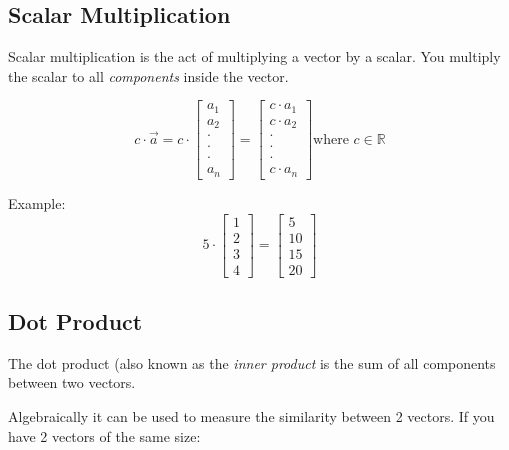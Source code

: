 \documentclass[12pt]{report}
\begin{document}
        \newpage
        \subsection{Scalar Multiplication}
            Scalar multiplication is the act of multiplying a vector by a scalar. You multiply the scalar to all \emph{components} inside the vector.

            \begin{equation}
                c \cdot \vec{a} = c \cdot
                    \begin{bmatrix} a_1 \\ a_2 \\ \cdot \\ \cdot \\ \cdot \\ a_n \end{bmatrix} =
                    \begin{bmatrix}  c \cdot a_1 \\ c \cdot a_2 \\ \cdot \\ \cdot \\ \cdot \\  c \cdot a_n \end{bmatrix} 
                \text{where } c \in \mathbb{R}
            \end{equation}

            Example:
            \begin{equation}
                5 \cdot \begin{bmatrix} 1 \\ 2 \\ 3 \\ 4 \end{bmatrix} =
                \begin{bmatrix} 5 \\ 10 \\ 15 \\ 20 \end{bmatrix}
            \end{equation}

        \subsection{Dot Product}
            The dot product (also known as the \emph{inner product} is the sum of all components between two vectors.

            Algebraically it can be used to measure the similarity between 2 vectors.
            If you have 2 vectors of the same size:
\end{document}
